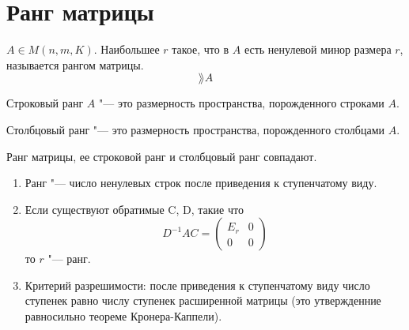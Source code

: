 ﻿\section{Ранг матрицы}
\begin{Def}
	$A \in M(n, m, K)$.
	Наибольшее $r$ такое, что в $A$ есть ненулевой минор размера $r$, называется рангом матрицы.
	\[ \rang A \]
\end{Def}

\begin{Def}
	Строковый ранг $A$ "--- это размерность пространства, порожденного строками $A$.
\end{Def}

\begin{Def}
	Столбцовый ранг "--- это размерность пространства, порожденного столбцами $A$.
\end{Def}

\begin{theorem}
	Ранг матрицы, ее строковой ранг и столбцовый ранг совпадают.
\end{theorem}

\begin{Rem}
	\begin{enumerate}
	\item
		Ранг "--- число ненулевых строк после приведения к ступенчатому виду.
	\item
		Если существуют обратимые C, D, такие что
		\[
			D^{-1}AC = \begin{pmatrix}
				E_r & 0 \\
				0   & 0
			\end{pmatrix}
		\]
		то $r$ "--- ранг.

	\item
		Критерий разрешимости: после приведения к ступенчатому виду число ступенек равно числу ступенек расширенной матрицы
		(это утвержденние равносильно теореме Кронера-Каппели).
	\end{enumerate}
\end{Rem}


